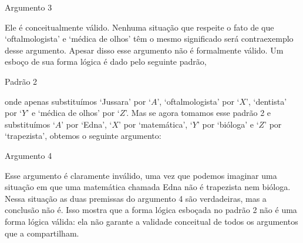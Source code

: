 \begin{description}
\item[Argumento 3]
\end{description}
Ele é conceitualmente válido.
Nenhuma situação que respeite o fato de que `oftalmologista' e `médica de olhos' têm o mesmo significado será contraexemplo desse argumento.
Apesar disso esse argumento não é formalmente válido.
Um esboço de sua forma lógica é dado pelo seguinte padrão,
\begin{description}
\item[Padrão 2]
\end{description}
 onde apenas substituímos `Jussara' por `$A$',  `oftalmologista' por `$X$', `dentista' por `$Y$' e  `médica de olhos' por `$Z$'.
 Mas se agora tomamos esse padrão 2 e substituímos `$A$' por `Edna', `$X$' por `matemática', `$Y$' por `bióloga' e `$Z$' por `trapezista', obtemos o seguinte argumento:
\begin{description}
\item[Argumento 4]
\end{description}
Esse argumento é claramente inválido, uma vez que podemos imaginar uma situação em que uma matemática chamada Edna não é trapezista nem bióloga.
Nessa situação as duas premissas do argumento 4 são verdadeiras, mas a conclusão não é.
Isso mostra que a forma lógica esboçada no padrão 2 não é uma forma lógica válida:
ela não garante a validade conceitual de todos os argumentos que a compartilham.

